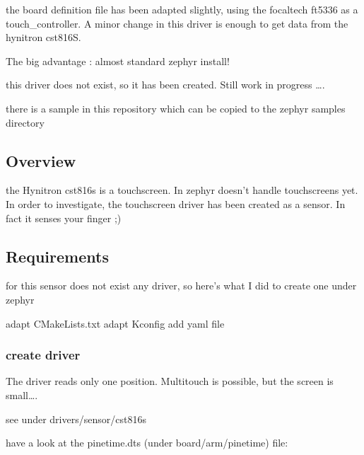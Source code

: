 \documentclass[letterpaper,10pt,english]{sphinxmanual}
\begin{document}
the board definition file has been adapted slightly, using the focaltech ft5336 as a touch\_controller. A minor change in this driver is enough to get data from the hynitron cst816S.

The big advantage : almost standard zephyr install!

\begin{sphinxVerbatim}[commandchars=\\\{\}]
\end{sphinxVerbatim}

this driver does not exist, so it has been created.
Still work in progress ….

there is a sample in this repository which can be copied to the zephyr samples directory

\begin{sphinxVerbatim}[commandchars=\\\{\}]
\end{sphinxVerbatim}


\subsection{Overview}
\label{\detokenize{drivers/cst816s:overview}}
the Hynitron cst816s is a touchscreen.
In zephyr doesn’t handle touchscreens yet.
In order to investigate, the touchscreen driver has been created as a sensor.
In fact it senses your finger ;)


\subsection{Requirements}
\label{\detokenize{drivers/cst816s:requirements}}
for this sensor does not exist any driver, so here’s what I did to create one under zephyr

adapt CMakeLists.txt
adapt Kconfig
add yaml file


\subsubsection{create driver}
\label{\detokenize{drivers/cst816s:create-driver}}
The driver reads only one position.
Multitouch is possible, but the screen is small….

see under drivers/sensor/cst816s

have a look at the pinetime.dts (under board/arm/pinetime) file:
\end{document}
